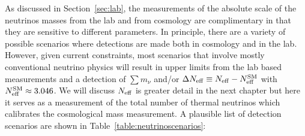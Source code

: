 As discussed in Section~\ref{sec:lab}, the measurements of the absolute scale of the neutrinos masses from the lab and from cosmology are complimentary in that they are sensitive to different parameters.  In principle, there are a variety of possible scenarios where detections are made both in cosmology and in the lab.  However, given current constraints, most scenarios that involve mostly conventional neutrino physics will result in upper limits from the lab based measurements and a detection of $\sum m_\nu$ and/or $\Delta N_{\rm eff} \equiv N_{\rm eff} - N_{\rm eff}^{\rm SM}$ with $N_{\rm eff}^{\rm SM} \approx 3.046$.  We will discuss $N_{\rm eff}$ is greater detail in the next chapter but here it serves as a measurement of the total number of thermal neutrinos which calibrates the cosmological mass measurement. A plausible list of detection scenarios are shown in Table~\ref{table:neutrinoscenarios}:

